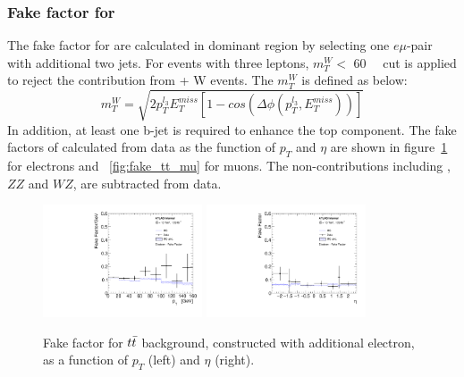 \subsubsection{Fake factor for \ttbar}

The fake factor for \ttbar are calculated in \ttbar dominant region by selecting one $e\mu$-pair with additional two jets.
For events with three leptons, $m_{T}^{W} <$ 60~\gev~ cut is applied to reject the contribution from \ttbar + W events.
The $m_{T}^{W}$ is defined as below:
\begin{equation}
	m_{T}^{W} = \sqrt{ 2p_{T}^{l_{3}} E_{T}^{miss} \left[1-cos\left(\Delta\phi\left(p_{T}^{l_{3}}, E_{T}^{miss}\right)\right)\right] }
\end{equation}
In addition, at least one b-jet is required to enhance the top component.
The fake factors of \ttbar calculated from data as the function of $p_{T}$ and $\eta$ are shown in figure~\ref{fig:fake_tt_el} for electrons and ~\ref{fig:fake_tt_mu} for muons.
The non-\ttbar contributions including \Zjet, $ZZ$ and $WZ$, are subtracted from data.
\begin{figure}[!htb]
  \centering
  \includegraphics[width=0.42\textwidth]{figures/VBSZZ/fakebkg/Electron_2Dff_ptttbarFakeFactorAddElectron_etapt_pavgy.pdf}
  \includegraphics[width=0.42\textwidth]{figures/VBSZZ/fakebkg/Electron_2Dff_etattbarFakeFactorAddElectron_etapt_pavgx.pdf}
  \caption{Fake factor for $t\bar{t}$ background, constructed with additional electron, as a function of $p_{T}$ (left) and $\eta$ (right).}
  \label{fig:fake_tt_el}
\end{figure}

